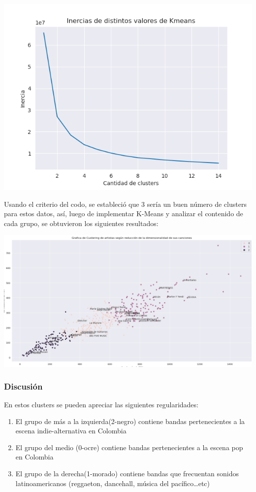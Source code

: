 \documentclass[11pt]{article}
\begin{document}
\begin{center}
\includegraphics[width=.9\linewidth]{./images/inercias1.png}
\end{center}

Usando el criterio del codo, se estableció
que 3 sería un buen número de clusters para estos datos, así, luego de
implementar K-Means y analizar el contenido de cada grupo, se obtuvieron los
siguientes resultados:

\begin{center}
\includegraphics[width=.9\linewidth]{./images/clustering1.png}
\end{center}

\subsubsection{Discusión}
\label{sec:orgd04c383}
En estos clusters se pueden apreciar las siguientes regularidades:
\begin{enumerate}
\item El grupo de más a la izquierda(2-negro) contiene bandas pertenecientes a la escena indie-alternativa en Colombia
\item El grupo del medio (0-ocre) contiene bandas pertenecientes a la escena pop en Colombia
\item El grupo de la derecha(1-morado) contiene bandas que frecuentan sonidos latinoamericanos (reggaeton, dancehall, música del pacífico\ldots{}etc)
\end{enumerate}
\end{document}
